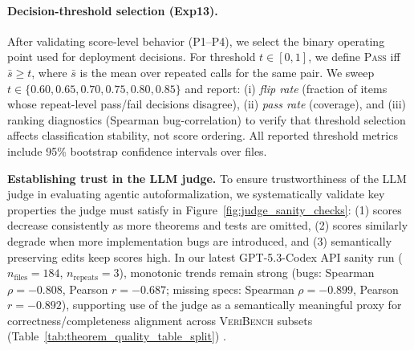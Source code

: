 \documentclass{article}
\begin{document}
\paragraph{Decision-threshold selection (Exp13).}
After validating score-level behavior (P1--P4), we select the binary operating point used for deployment decisions.
For threshold $t\in[0,1]$, we define \textsc{Pass} iff $\bar{s}\ge t$, where $\bar{s}$ is the mean over repeated calls for the same pair.
We sweep $t\in\{0.60,0.65,0.70,0.75,0.80,0.85\}$ and report:
(i) \emph{flip rate} (fraction of items whose repeat-level pass/fail decisions disagree),
(ii) \emph{pass rate} (coverage),
and (iii) ranking diagnostics (Spearman bug-correlation) to verify that threshold selection affects classification stability, not score ordering.
All reported threshold metrics include 95\% bootstrap confidence intervals over files.

\textbf{Establishing trust in the LLM judge.} To ensure trustworthiness of the LLM judge in evaluating agentic autoformalization, we systematically validate key properties the judge must satisfy in Figure~\ref{fig:judge_sanity_checks}: (1) scores decrease consistently as more theorems and tests are omitted, (2) scores similarly degrade when more implementation bugs are introduced, and (3) semantically preserving edits keep scores high.
In our latest GPT-5.3-Codex API sanity run (\(n_\text{files}=184\), \(n_\text{repeats}=3\)), monotonic trends remain strong (bugs: Spearman \(\rho=-0.808\), Pearson \(r=-0.687\); missing specs: Spearman \(\rho=-0.899\), Pearson \(r=-0.892\)), supporting use of the judge as a semantically meaningful proxy for correctness/completeness alignment across \textsc{VeriBench} subsets (Table~\ref{tab:theorem_quality_table_split}) \citep{Li2024TrustLLMJudgments,Kocmi2024HumanVsLLM}.
\end{document}
